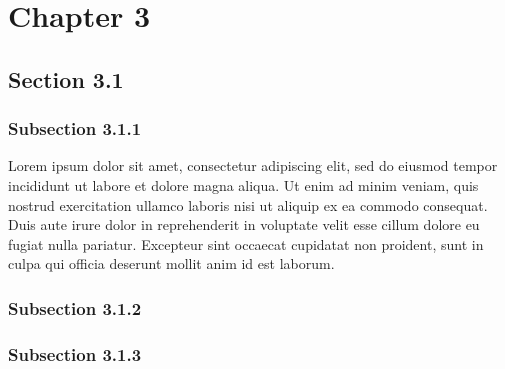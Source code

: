 \chapter{Chapter 3}
\label{chap_03}

\section{Section 3.1}


\subsection{Subsection 3.1.1}

Lorem ipsum dolor sit amet, consectetur adipiscing elit, sed do eiusmod tempor incididunt ut labore et dolore magna aliqua. Ut enim ad minim veniam, quis nostrud exercitation ullamco laboris nisi ut aliquip ex ea commodo consequat. Duis aute irure dolor in reprehenderit in voluptate velit esse cillum dolore eu fugiat nulla pariatur. Excepteur sint occaecat cupidatat non proident, sunt in culpa qui officia deserunt mollit anim id est laborum.


\subsection{Subsection 3.1.2}


\subsection{Subsection 3.1.3}



